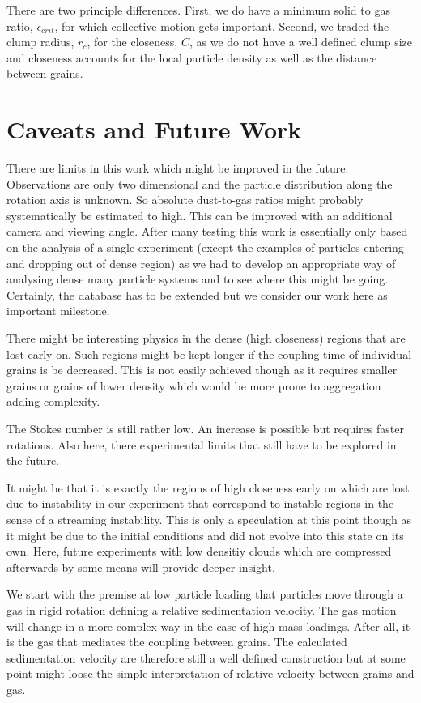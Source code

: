 There are two principle differences. First, we do have a minimum solid to gas ratio, $\epsilon_{crit}$, for which collective motion gets important. Second, we traded the clump radius, $r_c$, for the closeness, $C$, as we do not have a well defined clump size
and closeness accounts for the local particle density as well as the distance between grains. 

\section{Caveats and Future Work}

There are limits in this work which might be improved in the future. 
Observations are only two dimensional and the particle distribution along the rotation axis is unknown. So absolute dust-to-gas ratios might probably systematically be estimated to high. This can be improved with an additional camera and viewing angle.
After many testing this work is essentially only based on the analysis of a single experiment (except the examples of particles entering and dropping out of dense region) as we had to develop an appropriate way of analysing dense many particle systems and to see where this might be going. Certainly, the database has to be extended but we
consider our work here as important milestone.

There might be interesting physics in the dense (high closeness) regions that 
are lost early on. Such regions might be kept longer if the coupling time of 
individual grains is be decreased. This is not easily achieved though as it 
requires smaller grains or grains of lower density which would be more prone
to aggregation adding complexity.

The Stokes number is still rather low. An increase is possible but requires faster rotations.
Also here, there experimental limits that still have to be explored in the future. 

It might be that it is exactly the regions of high closeness early on which are lost due to
instability in our experiment that correspond to instable regions in the sense of a streaming instability. This is only a speculation at this point though as it might be due to the initial conditions and did not evolve into this state on its own. Here, future experiments with low densitiy clouds which are compressed afterwards by some means will provide deeper insight.

We start with the premise at low particle loading that particles move 
through a gas in rigid rotation defining a relative sedimentation velocity. The gas motion will change in a more complex way in the case of high mass loadings. After all, it is the gas that mediates the coupling between grains. The calculated sedimentation velocity are therefore still a well defined construction but at some point
might loose the simple interpretation of relative velocity between grains and gas. 

